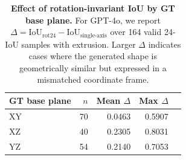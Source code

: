 \begin{table}[t]
\centering
\small
\setlength{\tabcolsep}{6pt}
\renewcommand{\arraystretch}{1.08}
\caption{\textbf{Effect of rotation-invariant IoU by GT base plane.}
For GPT-4o, we report $\Delta=\mathrm{IoU}_{\mathrm{rot24}}-\mathrm{IoU}_{\mathrm{single\text{-}axis}}$ over 164 valid 24-IoU samples with extrusion. Larger $\Delta$ indicates cases where the generated shape is geometrically similar but expressed in a mismatched coordinate frame.}
\label{tab:rot24_base_plane}
\begin{tabular}{@{}lrrrr@{}}
\toprule
GT base plane & $n$ & Mean $\Delta$ & Max $\Delta$ \\
\midrule
XY  & 70  & 0.0463 & 0.5907 \\
XZ  & 40  & 0.2305 & 0.8031 \\
YZ  & 54  & 0.2140 & 0.7053 \\
\bottomrule
\end{tabular}
\end{table}